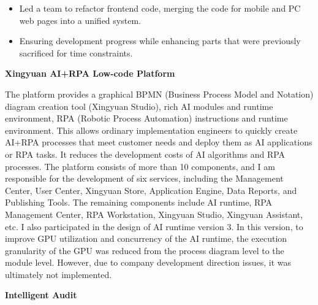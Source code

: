 \documentclass[a4paper]{article}
\newenvironment{changemargin}[2]{%
  \begin{list}{}{%
    \setlength{\topsep}{0pt}%
    \setlength{\leftmargin}{#1}%
    \setlength{\rightmargin}{#2}%
    \setlength{\listparindent}{\parindent}%
    \setlength{\itemindent}{\parindent}%
    \setlength{\parsep}{\parskip}%
  }%
  \item[]}{\end{list}
}
\newenvironment{body} {
	\vspace*{-16pt}
	\begin{changemargin}{-0.5in}{-0.5in}
  }
	{\end{changemargin}
}
\begin{document}
\begin{body}
	\vspace*{-8pt}
	\begin{itemize} \itemsep -0pt  %
		\item \begin{justify} 
			Led a team to refactor frontend code, merging the code for mobile and PC web pages into a unified system.
		\end{justify} 
	\end{itemize}

	\vspace*{-8pt}
	\begin{itemize} \itemsep -0pt  %
		\item \begin{justify} 
			Ensuring development progress while enhancing parts that were previously sacrificed for time constraints.
		\end{justify} 
	\end{itemize}
	
	\medskip

	\textbf{Xingyuan AI+RPA Low-code Platform} \\

	\begin{justify} 
		The platform provides a graphical BPMN (Business Process Model and Notation) diagram creation tool (Xingyuan Studio), rich AI modules and runtime environment, RPA (Robotic Process Automation) instructions and runtime environment. This allows ordinary implementation engineers to quickly create AI+RPA processes that meet customer needs and deploy them as AI applications or RPA tasks. It reduces the development costs of AI algorithms and RPA processes. The platform consists of more than 10 components, and I am responsible for the development of six services, including the Management Center, User Center, Xingyuan Store, Application Engine, Data Reports, and Publishing Tools. The remaining components include AI runtime, RPA Management Center, RPA Workstation, Xingyuan Studio, Xingyuan Assistant, etc. I also participated in the design of AI runtime version 3. In this version, to improve GPU utilization and concurrency of the AI runtime, the execution granularity of the GPU was reduced from the process diagram level to the module level. However, due to company development direction issues, it was ultimately not implemented.
	\end{justify} 
	
	\medskip

	\textbf{Intelligent Audit} \\


\end{body}
\end{document}
